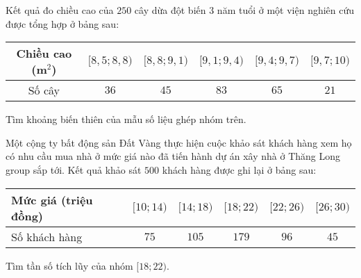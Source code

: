 \begin{ex}%
Kết quả đo chiều cao của $250$ cây dừa đột biến $3$ năm tuổi ở một viện nghiên cứu được tổng hợp ở bảng sau:
\begin{center}
\begin{tabular}{|c|c|c|c|c|c|}
\hline 
Chiều cao (m$^2$) & {$[8{,}5 ; 8{,}8)$} & {$[8{,}8 ; 9{,}1)$} & {$[9{,}1 ; 9{,}4)$} & {$[9{,}4 ; 9{,}7)$} & {$[9{,}7 ; 10)$} \\
\hline Số cây & $36$ & $45$ & $83$ & $65$ & $21$ \\
\hline
\end{tabular}
\end{center}
Tìm khoảng biến thiên của mẫu số liệu ghép nhóm trên.


\end{ex}

\begin{ex}%
Một cộng ty bất động sản Đất Vàng thực hiện cuộc khảo sát khách hàng xem họ có
nhu cầu mua nhà ở mức giá nào đã tiến hành dự án xây nhà ở Thăng Long group sắp tới. Kết quả khảo sát $500$ khách hàng được ghi lại ở bảng sau:
\begin{center}
\begin{tabular}{|l|c|c|c|c|c|}
\hline 
Mức giá (triệu đồng) & $[10 ; 14)$ & $[14 ; 18)$ & $[18 ; 22)$ & $[22 ; 26)$ & $[26 ; 30)$ \\
\hline Số khách hàng & $75$ & $105$ & $179$ & $96$ & $45$ \\
\hline
\end{tabular}
\end{center}
Tìm tần số tích lũy của nhóm $[18;22)$.


\loigiai{
Tần số tích lũy của nhóm $[18;22)$ là $cf_3 = 75+105+179 = 359$.
}
\end{ex}

